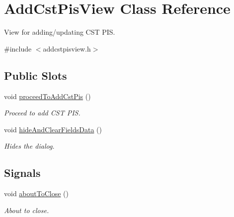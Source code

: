 \hypertarget{class_add_cst_pis_view}{\section{\-Add\-Cst\-Pis\-View \-Class \-Reference}
\label{class_add_cst_pis_view}
}


\-View for adding/updating \-C\-S\-T \-P\-I\-S.  




{\ttfamily \#include $<$addcstpisview.\-h$>$}

\subsection*{\-Public \-Slots}
\begin{DoxyCompactItemize}
\item 
void \hyperlink{class_add_cst_pis_view_ad13fa717edfea0c9286b0f469821203c}{proceed\-To\-Add\-Cst\-Pis} ()
\begin{DoxyCompactList}\small\item\em \-Proceed to add \-C\-S\-T \-P\-I\-S. \end{DoxyCompactList}\item 
void \hyperlink{class_add_cst_pis_view_aa32988f88c346d3a4733b5600ff192da}{hide\-And\-Clear\-Fields\-Data} ()
\begin{DoxyCompactList}\small\item\em \-Hides the dialog. \end{DoxyCompactList}\end{DoxyCompactItemize}
\subsection*{\-Signals}
\begin{DoxyCompactItemize}
\item 
void \hyperlink{class_add_cst_pis_view_a514c71b4b8086d991fcd687bf4698ee2}{about\-To\-Close} ()
\begin{DoxyCompactList}\small\item\em \-About to close. \end{DoxyCompactList}\end{DoxyCompactItemize}
